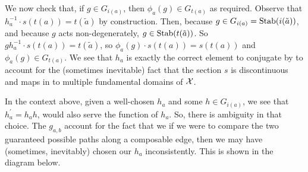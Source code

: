We now check that, if $g \in G_{i(a)}$, then  $\phi_a(g) \in G_{t(a)}$ as required.
Observe that $h_a^{-1} \cdot s(t(a)) = t(\tilde{a})$ by construction.
Then, because $g \in G_{i(a)} = \operatorname{Stab}(i(\tilde{a}))$, and because  $g$ acts non-degenerately,  $g \in \operatorname{Stab}(t(\tilde{a}))$.
So  $gh_a^{-1} \cdot s(t(a)) = t(\tilde{a})$, so $\phi_a(g) \cdot s(t(a)) = s(t(a))$ and  $\phi_a(g) \in G_{t(a)}$.
We see that $h_a$ is exactly the correct element to conjugate by to account for the (sometimes inevitable) fact that the section $s$ is discontinuous and maps in to multiple fundamental domains of $\mathcal{X}$.

In the context above, given a well-chosen $h_a$ and some $h \in G_{i(a)}$, we see that $h^\prime_a = h_ah$, would also serve the function of $h_a$.
So, there is ambiguity in that choice.
The $g_{a,b}$ account for the fact that we if we were to compare the two guaranteed possible paths along a composable edge, then we may have (sometimes, inevitably) chosen our $h_a$ inconsistently.
This is shown in the diagram below.

\begin{center}
\end{center}

